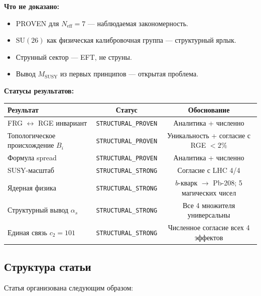 \documentclass[11pt,a4paper]{article}
\newcommand{\SU}{\ensuremath{\mathrm{SU}}}
\newcommand{\Neff}{\ensuremath{N_{\text{eff}}}}
\newcommand{\MSUSY}{\ensuremath{M_{\text{SUSY}}}}
\theoremstyle{definition}
\begin{document}
\medskip\noindent
\textbf{Что не доказано:}
\begin{itemize}
    \item PROVEN для $\Neff = 7$ --- наблюдаемая закономерность.
    \item $\SU(26)$ как физическая калибровочная группа ---
          структурный ярлык.
    \item Струнный сектор --- EFT, не струны.
    \item Вывод $\MSUSY$ из первых принципов --- открытая проблема.
\end{itemize}

\medskip\noindent
\textbf{Статусы результатов:}
\begin{center}
\begin{tabular}{lcc}
\toprule
Результат & Статус & Обоснование \\
\midrule
FRG $\leftrightarrow$ RGE инвариант & \texttt{STRUCTURAL\_PROVEN} &
Аналитика + численно \\
Топологическое происхождение $B_i$ & \texttt{STRUCTURAL\_PROVEN} &
Уникальность + согласие с RGE $< 2\%$ \\
Формула spread & \texttt{STRUCTURAL\_PROVEN} &
Аналитика + численно \\
SUSY-масштаб & \texttt{STRUCTURAL\_STRONG} &
Согласие с LHC 4/4 \\[0.3em]
Ядерная физика & \texttt{STRUCTURAL\_STRONG} &
$b$-кварк $\to$ Pb-208; 5 магических чисел \\[0.3em]
Структурный вывод $\alpha_s$ & \texttt{STRUCTURAL\_STRONG} &
Все 4 множителя универсальны \\[0.3em]
Единая связь $c_2 = 101$ & \texttt{STRUCTURAL\_STRONG} &
Численное согласие всех 4 эффектов \\
\bottomrule
\end{tabular}
\end{center}

\subsection{Структура статьи}

Статья организована следующим образом:
\end{document}
